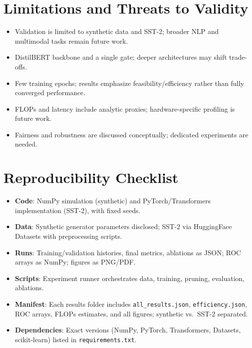 \documentclass{article}
\begin{document}
\section{Limitations and Threats to Validity}
\label{sec:limits}
\begin{itemize}[leftmargin=1.2em, itemsep=2pt]
  \item Validation is limited to synthetic data and SST-2; broader NLP and multimodal tasks remain future work.
  \item DistilBERT backbone and a single gate; deeper architectures may shift trade-offs.
  \item Few training epochs; results emphasize feasibility/efficiency rather than fully converged performance.
  \item FLOPs and latency include analytic proxies; hardware-specific profiling is future work.
  \item Fairness and robustness are discussed conceptually; dedicated experiments are needed.
\end{itemize}

\section{Reproducibility Checklist}
\label{sec:repro}
\begin{itemize}[leftmargin=1.2em, itemsep=2pt]
  \item \textbf{Code}: NumPy simulation (synthetic) and PyTorch/Transformers implementation (SST-2), with fixed seeds.
  \item \textbf{Data}: Synthetic generator parameters disclosed; SST-2 via HuggingFace Datasets with preprocessing scripts.
  \item \textbf{Runs}: Training/validation histories, final metrics, ablations as JSON; ROC arrays as NumPy; figures as PNG/PDF.
  \item \textbf{Scripts}: Experiment runner orchestrates data, training, pruning, evaluation, ablations.
  \item \textbf{Manifest}: Each results folder includes \texttt{all\_results.json}, \texttt{efficiency.json}, ROC arrays, FLOPs estimates, and all figures; synthetic vs.\ SST-2 separated.
  \item \textbf{Dependencies}: Exact versions (NumPy, PyTorch, Transformers, Datasets, scikit-learn) listed in \texttt{requirements.txt}.
\end{itemize}
\end{document}
